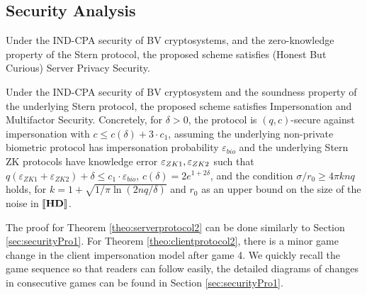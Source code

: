 \subsection{Security Analysis}
\label{sec:protocol2SecurityProof}
\begin{theorem}
  \label{theo:serverprotocol2}
  Under the IND-CPA security of BV cryptosystems, and the zero-knowledge property of the Stern protocol, the proposed
  scheme satisfies (Honest But Curious) Server Privacy Security.
\end{theorem}
\begin{theorem}
  \label{theo:clientprotocol2}
  Under the IND-CPA security of BV cryptosystem and the soundness property of
  the underlying Stern protocol, the proposed scheme satisfies Impersonation and
  Multifactor Security. Concretely, for $\delta>0$, the protocol is
  $(q,c)$-secure against impersonation with $c \leq c(\delta) + 3 \cdot c_1$,
  assuming the underlying non-private biometric protocol has impersonation
  probability $\varepsilon_{bio}$ and the underlying Stern ZK protocols have
  knowledge error $\varepsilon_{ZK1},\varepsilon_{ZK2}$ such that
  $q(\varepsilon_{ZK1}+\varepsilon_{ZK2}) + \delta \leq c_1 \cdot
  \varepsilon_{bio}$, $c(\delta) = 2 e^{1+2\delta}$, and the condition
  $\sigma/r_0 \geq 4 \pi k n q$ holds, for
  $k = 1 + \sqrt{1/\pi \ln(2nq/\delta)}$ and $r_0$ as an upper bound on the size
  of the noise in $\left\llbracket\mathbf{HD}\right\rrbracket$.
\end{theorem}

The proof for Theorem \ref{theo:serverprotocol2} can be done similarly to
Section \ref{sec:securityPro1}. For Theorem \ref{theo:clientprotocol2}, there is
a minor game change in the client impersonation model after game 4. We quickly
recall the game sequence so that readers can follow easily, the detailed
diagrams of changes in consecutive games can be found in Section
\ref{sec:securityPro1}.

